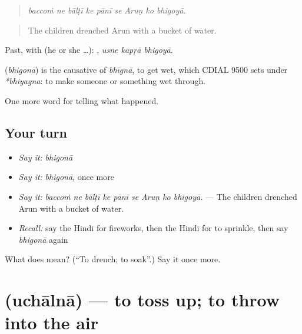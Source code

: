 \begin{quote}
        
\end{quote}

\begin{quote}
\emph{baccoṁ ne bālṭī ke pānī se Aruṇ ko bhigoyā.}
\end{quote}

\begin{quote}
The children drenched Arun with a bucket of water.
\end{quote}

Past, with  (he or she …):   , \emph{usne kapṛā bhigoyā}.

\begin{cousinweb}
\textbf{} (\emph{bhigonā}) is the causative of \emph{bhīgnā}, to get wet, which CDIAL 9500 sets under \emph{*bhiyagna}: to make someone or something wet through.
\end{cousinweb}

\begin{grammarlens}[title={What you've built}]
One more word for telling what happened.
\end{grammarlens}

\subsection*{Your turn}
\begin{itemize}
\raggedright
  \item \emph{Say it:} \emph{bhigonā}
  \item \emph{Say it:} \emph{bhigonā}, once more
  \item \emph{Say it:} \emph{baccoṁ ne bālṭī ke pānī se Aruṇ ko bhigoyā.} — The children drenched Arun with a bucket of water.
  \item \emph{Recall:} say the Hindi for fireworks, then the Hindi for to sprinkle, then say \emph{bhigonā} again
\end{itemize}

\begin{tcolorbox}[breakable,colback=teal!4,colframe=teal!35!black,title={Before you move on}]
What does  mean? (\textquotedblleft{}To drench; to soak\textquotedblright{}.) Say it once more.
\end{tcolorbox}
\section[\texorpdfstring{\hi{उछालना} (uchālnā)}{उछालना (uchālnā)}]{ (uchālnā) — to toss up; to throw into the air}

